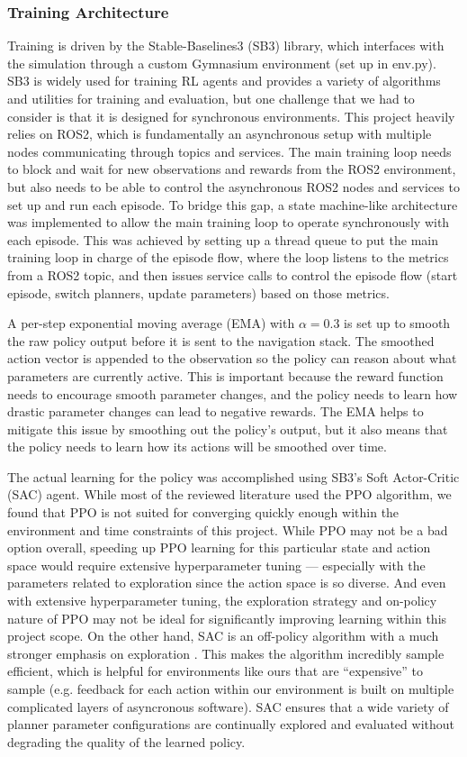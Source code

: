 \documentclass[conference]{IEEEtran}
\begin{document}
        \subsubsection{Training Architecture}
        Training is driven by the Stable-Baselines3 (SB3) library, which interfaces with the simulation through a custom
        Gymnasium environment (set up in env.py). SB3 is widely used for training RL agents and provides a variety of algorithms and utilities for training and evaluation, but one challenge that we had to consider is that it is designed for synchronous environments. This project heavily relies on ROS2, which is fundamentally an asynchronous setup with multiple nodes communicating through topics and services. The main training loop needs to block and wait for new observations and rewards from the ROS2 environment, but also needs to be able to control the asynchronous ROS2 nodes and services to set up and run each episode. To bridge this gap, a state machine-like architecture was implemented to allow the main training loop to operate synchronously with each episode. This was achieved by setting up a thread queue to put the main training loop in charge of the episode flow, where the loop listens to the metrics from a ROS2 topic, and then issues service calls to control the episode flow (start episode, switch planners, update parameters) based on those metrics.

        A per-step exponential moving average (EMA) with $\alpha=0.3$ is set up to smooth the raw policy output before it is sent to the navigation stack. The smoothed action vector is appended to the observation so the policy can reason about what parameters are currently active. This is important because the reward function needs to encourage smooth parameter changes, and the policy needs to learn how drastic parameter changes can lead to negative rewards. The EMA helps to mitigate this issue by smoothing out the policy's output, but it also means that the policy needs to learn how its actions will be smoothed over time.

        The actual learning for the policy was accomplished using SB3's Soft Actor-Critic (SAC) agent. While most of the reviewed literature used the PPO algorithm, we found that PPO is not suited for converging quickly enough within the environment and time constraints of this project. While PPO may not be a bad option overall, speeding up PPO learning for this particular state and action space would require extensive hyperparameter tuning --- especially with the parameters related to exploration since the action space is so diverse. And even with extensive hyperparameter tuning, the exploration strategy and on-policy nature of PPO may not be ideal for significantly improving learning within this project scope. On the other hand, SAC is an off-policy algorithm with a much stronger emphasis on exploration \cite{b11}. This makes the algorithm incredibly sample efficient, which is helpful for environments like ours that are ``expensive'' to sample (e.g. feedback for each action within our environment is built on multiple complicated layers of asyncronous software). SAC ensures that a wide variety of planner parameter configurations are continually explored and evaluated without degrading the quality of the learned policy.
\end{document}
